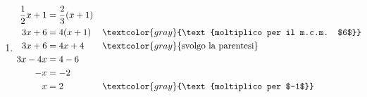 \begin{question}[ID=2.1, subtitle={Equazioni di primo grado}, difficulty=facile, tags={equazioni lineari}]
\begin{explanation}
\begin{enumerate}
\[\begin{aligned}
    2x-3x &= -2+2 && \textcolor{gray}{\text{$x$ a sinistra, numeri a destra}}\\
    -x &= 0\\
    x &= 0
    \end{aligned}\]
    \item \[\begin{aligned}
    \dfrac12x+1 &= \dfrac23(x+1)\\
    3x+6 &= 4(x+1) && \textcolor{gray}{\text{moltiplico per il m.c.m. $6$}}\\
    3x+6 &= 4x+4 && \textcolor{gray}{\text{svolgo la parentesi}}\\
    3x-4x &= 4-6\\
    -x &= -2\\
    x &= 2 && \textcolor{gray}{\text{moltiplico per $-1$}}
    \end{aligned}\]
\end{enumerate}
\end{explanation}
\end{question}


